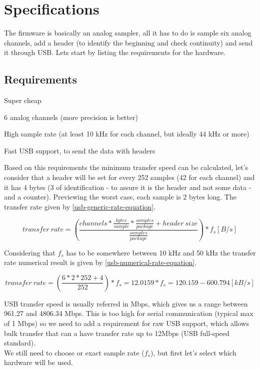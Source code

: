 \section{Specifications}
\label{firmware-specifications}

The firmware is basically an analog sampler, all it has to do is sample six analog
channels, add a header (to identify the beginning and check continuity) and send it
through USB. Lets start by listing the requirements for the hardware.

\subsection{Requirements}
\begin{itemlist}
  \item Super cheap
  \item 6 analog channels (more precision is better)
  \item High sample rate (at least 10 kHz for each channel, but ideally 44 kHz or more)
  \item Fast USB support, to send the data with headers
\end{itemlist}
Based on this requirements the minimum transfer speed can be calculated, let's
consider that a header will be set for every 252 samples (42 for each channel) and
it has 4 bytes (3 of identification - to assure it is the header and not some
data - and a counter). Previewing the worst case, each sample is 2 bytes long.
The transfer rate given by \autoref{usb-generic-rate-equation}.

\begin{equation}
  \label{usb-generic-rate-equation}
  transfer\ rate = \left( \frac{channels * \frac{bytes}{sample} * \frac{samples}{package} + header\ size}{\frac{samples}{package}}  \right ) * f_{s} [B/s]
\end{equation}

Considering that $f_{s}$ has to be somewhere between 10 kHz and 50 kHz the transfer
rate numerical result is given by \autoref{usb-numerical-rate-equation}.

\begin{equation}
  \label{usb-numerical-rate-equation}
  transfer\ rate = \left( \frac{6 * 2 * 252 + 4}{252}  \right ) * f_{s} = 12.0159 * f_{s} = 120.159 - 600.794 [kB/s]
\end{equation}

USB transfer speed is usually referred in Mbps, which gives us a range between
961.27 and 4806.34 Mbps. This is too high for serial communication (typical max of
1 Mbps) so we need to add a requirement for raw USB support, which allows bulk
transfer that can a have transfer rate up to 12Mbps (USB full-speed standard).\\
We still need to choose or exact sample rate ($f_{s}$), but first let's select which
hardware will be used.

